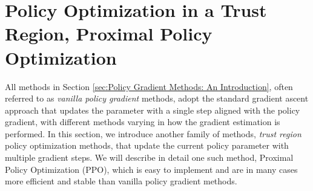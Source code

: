\section{Policy Optimization in a Trust Region, Proximal Policy Optimization}
All methods in Section \ref{sec:Policy Gradient Methods: An Introduction}, often referred to as {\em vanilla policy gradient} methods, adopt the standard gradient ascent approach that updates the parameter with a single step aligned with the policy gradient, with different methods varying in how the gradient estimation is performed.
In this section, we introduce another family of methods, {\em trust region} policy optimization methods, that update the current policy parameter with multiple gradient steps.
We will describe in detail one such method, Proximal Policy Optimization (PPO),
which is easy to implement and are in many cases more efficient and stable than vanilla policy gradient methods.

